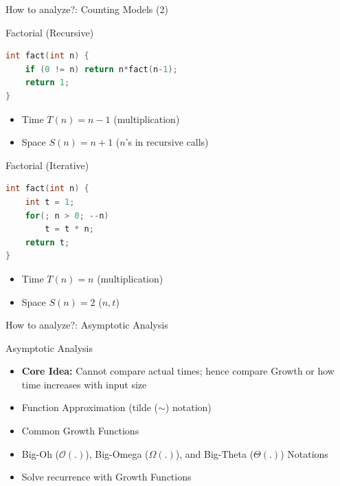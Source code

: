 \documentclass[aspectratio=169, xcolor=dvipsnames]{beamer}
\begin{document}
\begin{frame}[fragile]{How to analyze?: Counting Models (2)}
    \begin{exampleblock}{Factorial (Recursive)}
\begin{lstlisting}[language=C++]
int fact(int n) {
    if (0 != n) return n*fact(n-1);
    return 1;
}
\end{lstlisting}
        \begin{itemize}[<+->]
            \item Time $T(n) = n - 1$ (multiplication)
            \item Space $S(n) = n + 1$ ($n$'s in recursive calls)
        \end{itemize}
    \end{exampleblock}
    \begin{exampleblock}{Factorial (Iterative)}
\begin{lstlisting}[language=C++]
int fact(int n) {
    int t = 1;
    for(; n > 0; --n)
        t = t * n;
    return t;
}
\end{lstlisting}
        \begin{itemize}[<+->]
            \item Time $T(n) = n$ (multiplication)
            \item Space $S(n) = 2$ ($n, t$)
        \end{itemize}
    \end{exampleblock}
\end{frame}

\begin{frame}{How to analyze?: Asymptotic Analysis}
    \begin{block}{Asymptotic Analysis}
        \begin{itemize}[<+->]
            \item \textbf{Core Idea:} Cannot compare actual times; hence compare Growth or how time increases with input size
            \item Function Approximation (tilde ($\sim$) notation)
            \item Common Growth Functions
            \item Big-Oh ($\mathcal{O}(.)$), Big-Omega ($\Omega(.)$), and Big-Theta ($\Theta(.)$) Notations
            \item Solve recurrence with Growth Functions
        \end{itemize}
    \end{block}
\end{frame}
\end{document}
